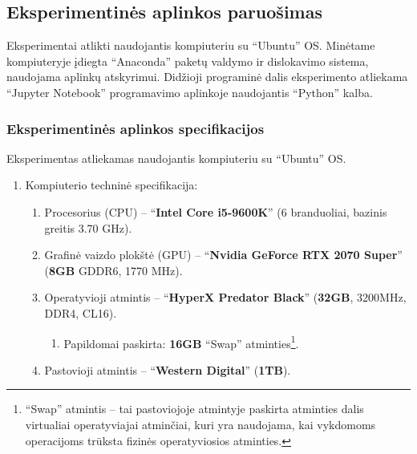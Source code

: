 \documentclass{VUMIFPSbakalaurinis}
\begin{document}
\subsection{Eksperimentinės aplinkos paruošimas}
{
	Eksperimentai atlikti naudojantis kompiuteriu su \enquote{Ubuntu} OS. Minėtame kompiuteryje įdiegta \enquote{Anaconda} paketų valdymo ir dislokavimo sistema, naudojama aplinkų atskyrimui. Didžioji programinė dalis eksperimento atliekama \enquote{Jupyter Notebook} programavimo aplinkoje naudojantis \enquote{Python} kalba.
}
\subsubsection{Eksperimentinės aplinkos specifikacijos}
{
	Eksperimentas atliekamas naudojantis kompiuteriu su \enquote{Ubuntu} OS.
	
	\begin{enumerate}
		\item Kompiuterio techninė specifikacija:
		\begin{enumerate}
			\item Procesorius (CPU) -- \enquote{\textbf{Intel Core i5-9600K}} (6 branduoliai, bazinis greitis 3.70 GHz).
			\item Grafinė vaizdo plokštė (GPU) -- \enquote{\textbf{Nvidia GeForce RTX 2070 Super}} (\textbf{8GB} GDDR6, 1770 MHz).
			\item Operatyvioji atmintis -- \enquote{\textbf{HyperX Predator Black}} (\textbf{32GB}, 3200MHz, DDR4, CL16).
			\begin{enumerate}
				\item Papildomai paskirta: \textbf{16GB} \enquote{Swap} atminties\footnote{\enquote{Swap} atmintis -- tai pastoviojoje atmintyje paskirta atminties dalis virtualiai operatyviajai atminčiai, kuri yra naudojama, kai vykdomoms operacijoms trūksta fizinės operatyviosios atminties.}.
			\end{enumerate}
			\item Pastovioji atmintis -- \enquote{\textbf{Western Digital}} (\textbf{1TB}).
		\end{enumerate}
	

\end{enumerate}}
\end{document}
